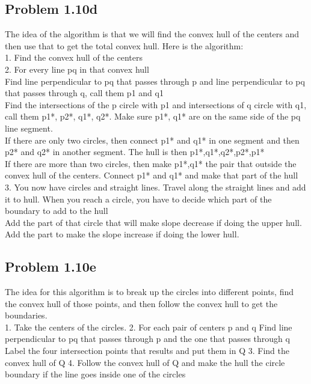 \documentclass[11pt,psfig]{article}
\begin{document}
\subsection*{Problem 1.10d}

The idea of the algorithm is that we will find the convex hull of the centers and then use that to get the total convex hull. Here is the algorithm:\\
1. Find the convex hull of the centers\\
2. For every line pq in that convex hull\\
			Find line perpendicular to pq that passes through p and line perpendicular to pq that passes through q, call them p1 and q1\\
			Find the intersections of the p circle with p1 and intersections of q circle with q1, call them p1*, p2*, q1*, q2*. Make sure p1*, q1* are on the same side of the pq line segment. \\
			If there are only two circles, then connect p1* and q1* in one segment and then p2* and q2* in another segment. The hull is then p1*,q1*,q2*,p2*,p1*\\
			If there are more than two circles, then make p1*,q1* the pair that outside the convex hull of the centers. Connect p1* and q1* and make that part of the hull\\
3. You now have circles and straight lines. Travel along the straight lines and add it to hull. When you reach a circle, you have to decide which part of the boundary to add to the hull\\
			Add the part of that circle that will make slope decrease if doing the upper hull.\\
			Add the part to make the slope increase if doing the lower hull.

\subsection*{Problem 1.10e}

The idea for this algorithm is to break up the circles into different points, find the convex hull of those points, and then follow the convex hull to get the boundaries. 
\\
1. Take the centers of the circles.
2. For each pair of centers p and q
		Find line perpendicular to pq that passes through p and the one that passes through q
		Label the four intersection points that results and put them in Q
3. Find the convex hull of Q
4. Follow the convex hull of Q and make the hull the circle boundary if the line goes inside one of the circles
\end{document}
